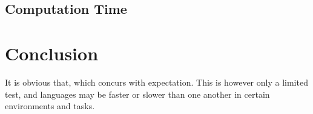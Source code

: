 \documentclass[10pt,a4paper]{article}
\begin{document}
		\subsection*{Computation Time}
	
	\section*{Conclusion}
	
	It is obvious that, which concurs with expectation. This is however only a limited test, and languages may be faster or slower than one another in certain environments and tasks.
	
\end{document}
